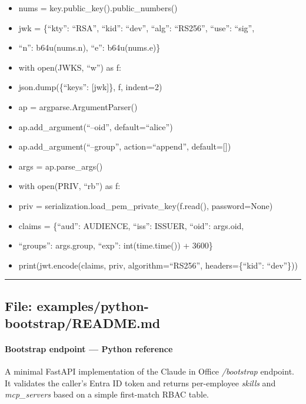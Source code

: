 \documentclass[11pt]{article}
\begin{document}
\begin{itemize}[leftmargin=*,itemsep=2pt,topsep=2pt]
\item {} nums = key.public\_\allowbreak{}key().public\_\allowbreak{}numbers()
\item {} jwk = \{``kty'': ``RSA'', ``kid'': ``dev'', ``alg'': ``RS256'', ``use'': ``sig'',
\item {} ``n'': b64u(nums.n), ``e'': b64u(nums.e)\}
\item {} with open(JWKS, ``w'') as f:
\item {} json.dump(\{``keys'': [jwk]\}, f, indent=2)
\item {} ap = argparse.ArgumentParser()
\item {} ap.add\_\allowbreak{}argument(``--oid'', default=``alice'')
\item {} ap.add\_\allowbreak{}argument(``--group'', action=``append'', default=[])
\item {} args = ap.parse\_\allowbreak{}args()
\item {} with open(PRIV, ``rb'') as f:
\item {} priv = serialization.load\_\allowbreak{}pem\_\allowbreak{}private\_\allowbreak{}key(f.read(), password=None)
\item {} claims = \{``aud'': AUDIENCE, ``iss'': ISSUER, ``oid'': args.oid,
\item {} ``groups'': args.group, ``exp'': int(time.time()) + 3600\}
\item {} print(jwt.encode(claims, priv, algorithm=``RS256'', headers=\{``kid'': ``dev''\}))
\end{itemize}

\vspace{0.8em}\hrule\vspace{0.8em}

\subsection{File: examples/python-bootstrap/README.md}\label{file:examples-python-bootstrap-README-md}

\paragraph{Bootstrap endpoint — Python reference}\mbox{}\par

A minimal FastAPI implementation of the Claude in Office \emph{/bootstrap} endpoint. It validates the caller's Entra ID token and returns per-employee \emph{skills} and \emph{mcp\_\allowbreak{}servers} based on a simple first-match RBAC table.
\end{document}
